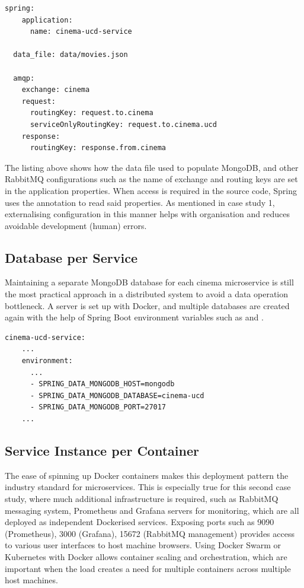 \begin{lstlisting}[caption=UCD cinema's \code{application.yml}.]
  spring:
    application:
      name: cinema-ucd-service

  data_file: data/movies.json

  amqp:
    exchange: cinema
    request:
      routingKey: request.to.cinema
      serviceOnlyRoutingKey: request.to.cinema.ucd
    response:
      routingKey: response.from.cinema
\end{lstlisting}

The listing above shows how the data file used to populate MongoDB, and other RabbitMQ configurations such as the name of exchange and routing keys are set in the application properties. When access is required in the source code, Spring uses the  annotation to read said properties. As mentioned in case study 1, externalising configuration in this manner helps with organisation and reduces avoidable development (human) errors.

\subsection{Database per Service}

Maintaining a separate MongoDB database for each cinema microservice is still the most practical approach in a distributed system to avoid a data operation bottleneck. A server is set up with Docker, and multiple databases are created again with the help of Spring Boot environment variables such as  and .

\begin{lstlisting}[caption=Snippet from \code{docker-compose.yml} for UCD cinema.]
  cinema-ucd-service:
    ...
    environment:
      ...
      - SPRING_DATA_MONGODB_HOST=mongodb
      - SPRING_DATA_MONGODB_DATABASE=cinema-ucd
      - SPRING_DATA_MONGODB_PORT=27017
    ...
\end{lstlisting}

\subsection{Service Instance per Container}

The ease of spinning up Docker containers makes this deployment pattern the industry standard for microservices. This is especially true for this second case study, where much additional infrastructure is required, such as RabbitMQ messaging system, Prometheus and Grafana servers for monitoring, which are all deployed as independent Dockerised services. Exposing ports such as 9090 (Prometheus), 3000 (Grafana), 15672 (RabbitMQ management) provides access to various user interfaces to host machine browsers. Using Docker Swarm or Kubernetes with Docker allows container scaling and orchestration, which are important when the load creates a need for multiple containers across multiple host machines.

